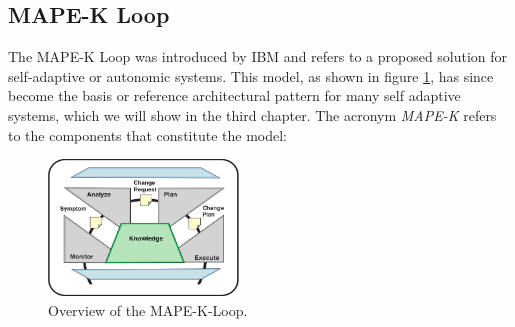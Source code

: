     \subsection{MAPE-K Loop}
    \label{sub:mape}
    The MAPE-K Loop was introduced by IBM \cite{Kephart:2003:VAC:642194.642200} and refers to a proposed solution for self-adaptive or autonomic systems.
    This model, as shown in figure \ref{fig:mape}, has since become the basis or reference architectural pattern for many self adaptive systems, which we will show in the third chapter.
    The acronym \textit{MAPE-K} refers to the components that constitute the model:
    \begin{figure}[hbt]
        \centering
        \includegraphics[width=0.45\textwidth]{Bilder/mape.png}
        \caption{
                Overview of the MAPE-K-Loop\cite{Kephart:2003:VAC:642194.642200}.
        }
        \label{fig:mape}
    \end{figure}  

